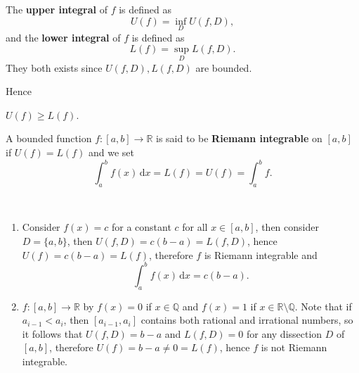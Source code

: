 \begin{definition}
    The \textbf{upper integral} of $f$ is defined as 
    \[
        U(f) = \inf_D U(f,D),
    \]
    and the \textbf{lower integral} of $f$ is defined as 
    \[
        L(f) = \sup_D L(f,D).
    \]
    They both exists since $ U(f,D),L(f,D) $ are bounded.
\end{definition}
Hence 
\begin{sprop}
    $U(f)\ge L(f)$.
\end{sprop}

\begin{definition}
    A bounded function $ f:[a,b]\to \mathbb{R}  $ is said to be \textbf{Riemann integrable} on $[a,b]$ if $ U(f)=L(f) $ and we set
    $$\int_a^bf(x)\,\mathrm dx=L(f)=U(f) = \int_{a}^{b} f.$$
\end{definition}
\begin{example}\
    \begin{enumerate}
        \item Consider $f(x)=c$ for a constant $c$ for all $x\in [a,b]$, then consider $D=\{a,b\}$, then $U(f,D)=c(b-a)=L(f,D)$, hence $U(f)=c(b-a)=L(f)$, therefore $f$ is Riemann integrable and
        $$\int_a^bf(x)\,\mathrm dx=c(b-a).$$
        \item $f:[a,b]\to\mathbb R$ by $f(x)=0$ if $x\in\mathbb Q$ and $f(x)=1$ if $x\in\mathbb R\setminus\mathbb Q$. Note that if $a_{i-1}<a_i$, then $[a_{i-1},a_i]$ contains both rational and irrational numbers, so it follows that $U(f,D)=b-a$ and $L(f,D)=0$ for any dissection $D$ of $[a,b]$, therefore $U(f)=b-a\neq 0=L(f)$, hence $f$ is not Riemann integrable.
    \end{enumerate}
\end{example}